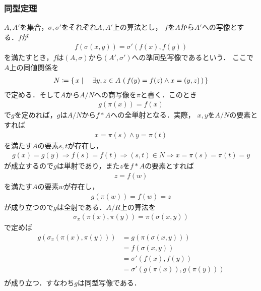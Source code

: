 \subsubsection{同型定理}
	$A,A'$を集合，$\sigma,\sigma'$をそれぞれ$A,A'$上の算法とし，
	$f$を$A$から$A'$への写像とする．$f$が
	\begin{align}
		f(\sigma(x,y)) = \sigma'(f(x),f(y))
	\end{align}
	を満たすとき，$f$は$(A,\sigma)$から$(A',\sigma')$への準同型写像であるという．
	ここで$A$上の同値関係を
	\begin{align}
		N \coloneqq \left\{\, x \mid \quad \exists y,z \in A\, 
		\left(\, f(y) = f(z) \wedge x = (y,z)\, \right)\, \right\}
	\end{align}
	で定める．そして$A$から$A/N$への商写像を$\pi$と書く．このとき
	\begin{align}
		g\left(\pi(x)\right) = f(x)
	\end{align}
	で$g$を定めれば，$g$は$A/N$から$f \ast A$への全単射となる．実際，
	$x,y$を$A/N$の要素とすれば
	\begin{align}
		x = \pi(s) \wedge y = \pi(t)
	\end{align}
	を満たす$A$の要素$s,t$が存在し，
	\begin{align}
		g(x) = g(y) \Longrightarrow f(s) = f(t)
		\Longrightarrow (s,t) \in N
		\Longrightarrow x = \pi(s) = \pi(t) = y
	\end{align}
	が成立するので$g$は単射であり，また$z$を$f \ast A$の要素とすれば
	\begin{align}
		z = f(w)
	\end{align}
	を満たす$A$の要素$w$が存在し，
	\begin{align}
		g(\pi(w)) = f(w) = z
	\end{align}
	が成り立つので$g$は全射である．$A/R$上の算法を
	\begin{align}
		\sigma_\pi(\pi(x),\pi(y)) = \pi(\sigma(x,y))
	\end{align}
	で定めば
	\begin{align}
		g \left( \sigma_\pi(\pi(x),\pi(y)) \right) 
		&= g \left( \pi(\sigma(x,y)) \right) \\
		&= f \left( \sigma(x,y) \right) \\
		&= \sigma'(f(x),f(y)) \\
		&= \sigma' \left( g(\pi(x)),g(\pi(y)) \right) \\
	\end{align}
	が成り立つ．すなわち$g$は同型写像である．
	

